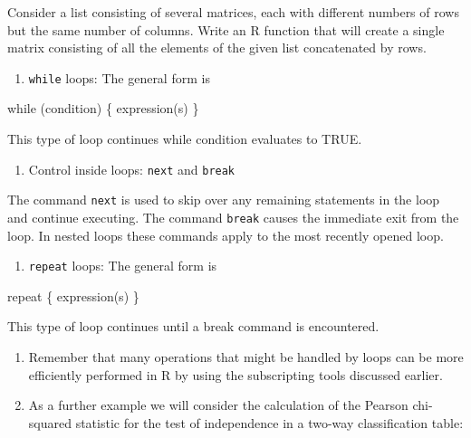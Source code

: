 \documentclass[
]{book}
\newenvironment{Shaded}{\begin{snugshade}}{\end{snugshade}}
\newcommand{\NormalTok}[1]{#1}
\providecommand{\tightlist}{%
  \setlength{\itemsep}{0pt}\setlength{\parskip}{0pt}}
\begin{document}
Consider a list consisting of several matrices, each with different numbers of rows but the same number of columns. Write an R function that will create a single matrix consisting of all the elements of the given list concatenated by rows.

\begin{enumerate}
\def\labelenumi{(\alph{enumi})}
\setcounter{enumi}{1}
\tightlist
\item
  \texttt{while} loops: The general form is
\end{enumerate}

\begin{Shaded}
\begin{Highlighting}[]
\NormalTok{while (condition)}
\NormalTok{        \{ expression(s)}
\NormalTok{        \}}
\end{Highlighting}
\end{Shaded}

This type of loop continues while condition evaluates to TRUE.

\begin{enumerate}
\def\labelenumi{(\alph{enumi})}
\setcounter{enumi}{2}
\tightlist
\item
  Control inside loops: \texttt{next} and \texttt{break}
\end{enumerate}

The command \texttt{next} is used to skip over any remaining statements in the loop and continue executing. The command \texttt{break} causes the immediate exit from the loop. In nested loops these commands apply to the most recently opened loop.

\begin{enumerate}
\def\labelenumi{(\alph{enumi})}
\setcounter{enumi}{3}
\tightlist
\item
  \texttt{repeat} loops: The general form is
\end{enumerate}

\begin{Shaded}
\begin{Highlighting}[]
\NormalTok{repeat \{ expression(s)}
\NormalTok{       \}}
\end{Highlighting}
\end{Shaded}

This type of loop continues until a break command is encountered.

\begin{enumerate}
\def\labelenumi{(\alph{enumi})}
\setcounter{enumi}{4}
\item
  Remember that many operations that might be handled by loops can be more efficiently performed in R by using the subscripting tools discussed earlier.
\item
  As a further example we will consider the calculation of the Pearson chi-squared statistic for the test of independence in a two-way classification table:
\end{enumerate}
\end{document}
